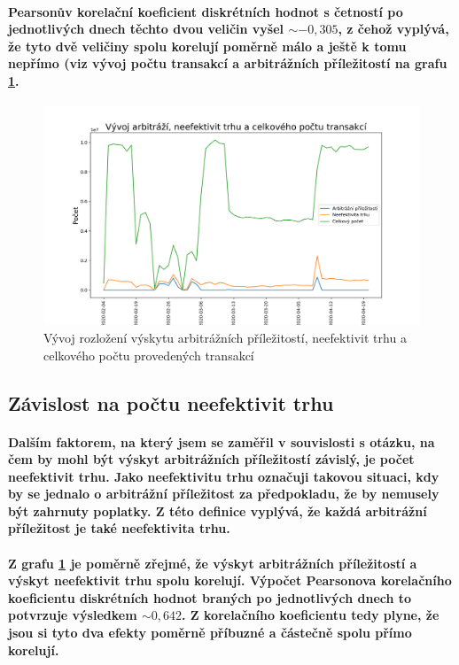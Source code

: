 \documentclass[thesis=B,czech]{FITthesis}[2019/03/21]
\begin{document}
\paragraph{
Pearsonův korelační koeficient diskrétních hodnot s četností po jednotlivých dnech těchto dvou veličin vyšel \(\sim-0,305\), z čehož vyplývá, že tyto dvě veličiny spolu korelují poměrně málo a ještě k tomu nepřímo (viz vývoj počtu transakcí a arbitrážních příležitostí na grafu \ref{occurence_correlation}.
}
\begin{figure}\centering
	\includegraphics[width=1\textwidth]{images/occurence_correlation.png}
	\caption{Vývoj rozložení výskytu arbitrážních příležitostí, neefektivit trhu a celkového počtu provedených transakcí}\label{occurence_correlation}
\end{figure}
\subsection{Závislost na počtu neefektivit trhu}
\paragraph{
Dalším faktorem, na který jsem se zaměřil v souvislosti s otázku, na čem by mohl být výskyt arbitrážních příležitostí závislý, je počet neefektivit trhu. Jako neefektivitu trhu označuji takovou situaci, kdy by se jednalo o arbitrážní příležitost za předpokladu, že by nemusely být zahrnuty poplatky. Z této definice vyplývá, že každá arbitrážní příležitost je také neefektivita trhu.
}
\paragraph{
Z grafu \ref{occurence_correlation} je poměrně zřejmé, že výskyt arbitrážních příležitostí a výskyt neefektivit trhu spolu korelují. Výpočet Pearsonova korelačního koeficientu diskrétních hodnot braných po jednotlivých dnech to potvrzuje výsledkem \(\sim 0,642\). Z korelačního koeficientu tedy plyne, že jsou si tyto dva efekty poměrně příbuzné a částečně spolu přímo korelují. 
}
\end{document}
